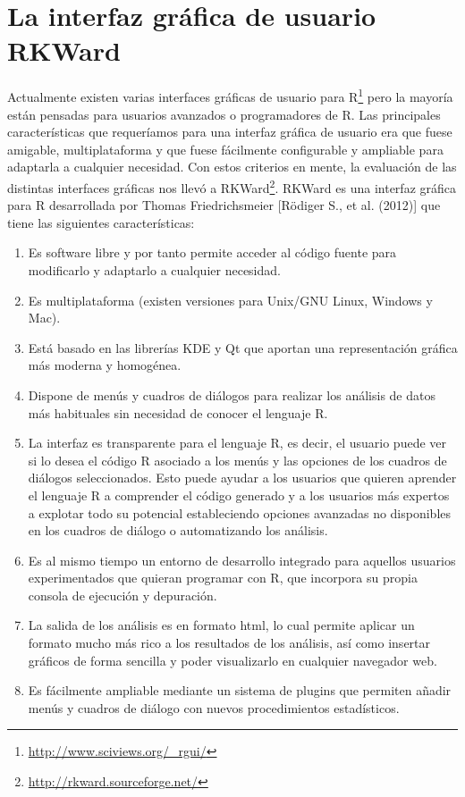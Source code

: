 \documentclass[10pt,twoside,spanish]{article}
\numberwithin{equation}{section}
\begin{document}
\section{La interfaz gráfica de usuario RKWard}
Actualmente existen varias interfaces gráficas de usuario para R\footnote{\url{http://www.sciviews.org/_rgui/}} pero la mayoría están
pensadas para usuarios avanzados o programadores de R.
Las principales características que requeríamos para una interfaz gráfica de usuario era que fuese amigable, multiplataforma y que fuese
fácilmente configurable y ampliable para adaptarla a cualquier necesidad.
Con estos criterios en mente, la evaluación de las distintas interfaces gráficas nos llevó a
RKWard\footnote{\url{http://rkward.sourceforge.net/}}.
RKWard es una interfaz gráfica para R desarrollada por Thomas Friedrichsmeier [Rödiger S., et al. (2012)]
que tiene las siguientes características:
\begin{enumerate}
\item Es software libre y por tanto permite acceder al código fuente para modificarlo y adaptarlo a cualquier necesidad. 
\item Es multiplataforma (existen versiones para Unix/GNU Linux, Windows y Mac).
\item Está basado en las librerías KDE y Qt que aportan una representación gráfica más moderna y homogénea.
\item Dispone de menús y cuadros de diálogos para realizar los análisis de datos más habituales sin necesidad de conocer el lenguaje R.
\item La interfaz es transparente para el lenguaje R, es decir, el usuario puede ver si lo desea el código R asociado a los
menús y las opciones de los cuadros de diálogos seleccionados.
Esto puede ayudar a los usuarios que quieren aprender el lenguaje R a comprender
el código generado y a los usuarios más expertos a explotar todo su potencial estableciendo opciones avanzadas no disponibles en los cuadros
de diálogo o automatizando los análisis.
\item Es al mismo tiempo un entorno de desarrollo integrado para aquellos usuarios experimentados que quieran programar con R, que incorpora
su propia consola de ejecución y depuración. 
\item La salida de los análisis es en formato html, lo cual permite aplicar un formato mucho más rico a los resultados de los análisis, así
como insertar gráficos de forma sencilla y poder visualizarlo en cualquier navegador web. 
\item Es fácilmente ampliable mediante un sistema de plugins que permiten añadir menús y cuadros de diálogo con nuevos procedimientos
estadísticos. 
\end{enumerate}
\end{document}
